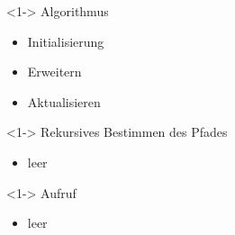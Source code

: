 \begin{frame}
	\begin{block} <1-> {Algorithmus}
		\begin{itemize}
		\item <1-> Initialisierung
		\item <2-> Erweitern
		\item <3-> Aktualisieren
		\end{itemize}
	\end{block}	
\end{frame}


\begin{frame}
	\begin{block} <1-> {Rekursives Bestimmen des Pfades}
		\begin{itemize}
			\item leer
		\end{itemize}
	\end{block}	
\end{frame}


\begin{frame}
	\begin{block} <1-> {Aufruf}
		\begin{itemize}
			\item leer
		\end{itemize}
	\end{block}	
\end{frame}


			

